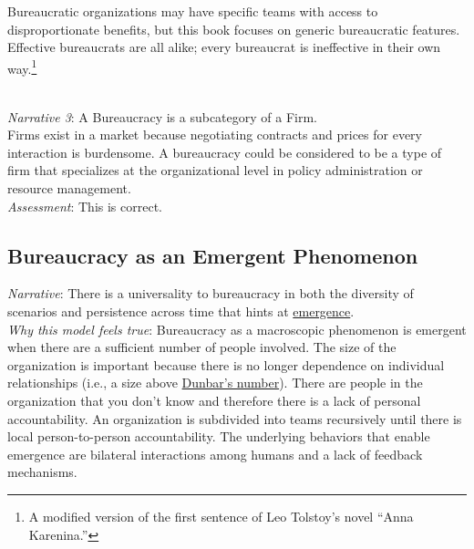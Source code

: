 Bureaucratic organizations may have specific teams with access to disproportionate benefits, but this book focuses on generic bureaucratic features. Effective bureaucrats are all alike; every bureaucrat is ineffective in their own way.\footnote{A modified version of the first sentence of Leo Tolstoy's novel ``Anna Karenina.''}



\ \\
\textit{Narrative 3}: A Bureaucracy is a subcategory of a Firm. \\
Firms exist in a market because negotiating contracts and prices for every interaction is burdensome. 
A bureaucracy could be considered to be a type of firm that specializes at the organizational level in policy administration or resource management. \\
\textit{Assessment}: This is correct.



\subsection*{Bureaucracy as an Emergent Phenomenon}

\textit{Narrative}: There is a universality to bureaucracy in both the diversity of scenarios and persistence across time that hints at \href{https://en.wikipedia.org/wiki/Emergence}{emergence}.\\
\iftoggle{WPinmargin}{\marginpar{[Wikipedia] emergence}}{}
\textit{Why this model feels true}: Bureaucracy as a macroscopic phenomenon is emergent when there are a sufficient number of people involved. The size of the organization is important because there is no longer dependence on individual relationships (i.e., a size above \href{https://en.wikipedia.org/wiki/Dunbar\%27s_number}{Dunbar's number}). 
\iftoggle{WPinmargin}{\marginpar{[Wikipedia] Dunbar's\\numbers}}{}
There are people in the organization that you don't know and therefore there is a lack of personal accountability. An organization is subdivided into teams recursively until there is local person-to-person accountability.  The underlying behaviors that enable emergence are bilateral interactions among humans and a lack of feedback mechanisms. 

